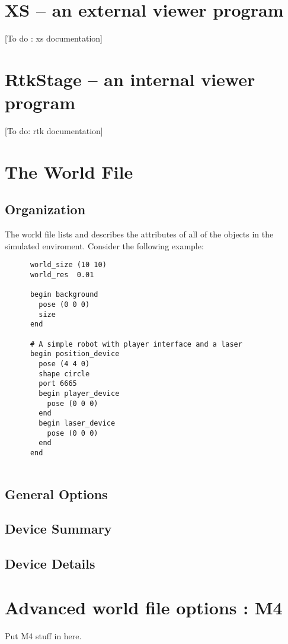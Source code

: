 \documentclass[11pt]{report}
\begin{document}
\chapter{XS -- an external viewer program}

  [To do : xs documentation]

\chapter{RtkStage -- an internal viewer program}

  [To do: rtk documentation]


\chapter{The World File}
  
  \section{Organization}

    The world file lists and describes the attributes of
    all of the objects in the simulated enviroment.
    Consider the following example:
      \begin{verbatim}
      world_size (10 10)
      world_res  0.01      

      begin background
        pose (0 0 0)
        size 
      end

      # A simple robot with player interface and a laser
      begin position_device
        pose (4 4 0)
        shape circle
        port 6665
        begin player_device
          pose (0 0 0)
        end
        begin laser_device
          pose (0 0 0)
        end
      end
      
      \end{verbatim}

  \section{General Options}

  \section{Device Summary}

  \section{Device Details}

\appendix

\chapter{Advanced world file options : M4}

  Put M4 stuff in here.
\end{document}
